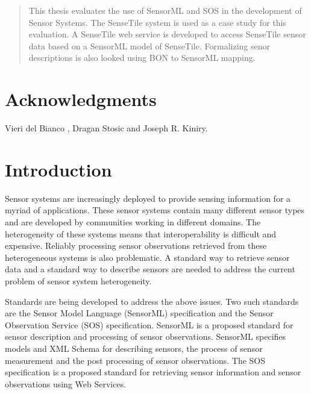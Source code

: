 \documentclass[]{final_report}
\begin{document}
\maketitle
\tableofcontents{}\newpage


\begin{abstract}
This thesis evaluates the use of SensorML and SOS in the development of Sensor Systems. The SenseTile system is used as a case study for this evaluation. A SenseTile web service is developed to access SenseTile sensor data based on a SensorML model of SenseTile. Formalizing senor descriptions is also looked using BON to SensorML mapping.

\end{abstract}




\newpage



\chapter*{Acknowledgments}

Vieri del Bianco , Dragan Stosic and Joseph R. Kiniry.


\chapter{Introduction}

Sensor systems are increasingly deployed to provide sensing information for a myriad of applications. These sensor systems contain many different sensor types and are developed by communities working in different domains. The heterogeneity of these systems means that interoperability is difficult and expensive. Reliably processing sensor observations retrieved from these heterogeneous systems is also problematic. A standard way to retrieve sensor data and a standard way to describe sensors are needed to address the current problem of sensor system heterogeneity. 

Standards are being developed to address the above issues. Two such standards are the Sensor Model Language (SensorML)\cite{SMLref} specification and the Sensor Observation Service (SOS)\cite{SOSref} specification. SensorML is a proposed standard for sensor description and processing of sensor observations. SensorML specifies models and XML Schema for describing sensors, the process of sensor measurement and the post processing of sensor observations. The SOS specification is a proposed standard for retrieving sensor information and sensor observations using Web Services. 
\end{document}

